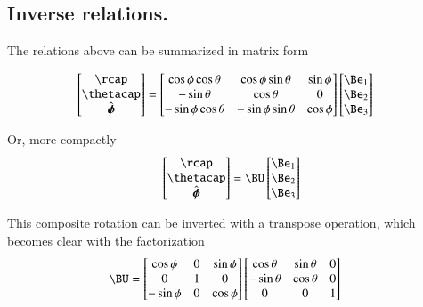 \documentclass{article}
\newcommand{\phicap}[0]{\hat{\boldsymbol{\phi}}}
\begin{document}
\subsection{ Inverse relations. }

The relations above can be summarized in matrix form

\begin{align}\label{eqn:rotation}
\begin{bmatrix}
\rcap \\
\thetacap \\
\phicap \\
\end{bmatrix}
&=
\begin{bmatrix}
\cos\phi \cos\theta & \cos\phi \sin\theta & \sin\phi \\
- \sin\theta & \cos\theta & 0 \\
- \sin\phi \cos\theta & - \sin\phi \sin\theta & \cos\phi \\
\end{bmatrix}
\begin{bmatrix}
\Be_1 \\
\Be_2 \\
\Be_3 \\
\end{bmatrix}
\end{align}

Or, more compactly
\begin{align*}
\begin{bmatrix}
\rcap \\
\thetacap \\
\phicap \\
\end{bmatrix}
=
\BU
\begin{bmatrix}
\Be_1 \\
\Be_2 \\
\Be_3 \\
\end{bmatrix}
\end{align*}

This composite rotation can be inverted with a transpose operation, which 
becomes clear with the factorization
\begin{align*}
\BU
&=
\begin{bmatrix}
\cos\phi & 0 & \sin\phi \\
0 & 1 & 0 \\
-\sin\phi & 0 & \cos\phi
\end{bmatrix}
\begin{bmatrix}
\cos\theta & \sin\theta & 0 \\
-\sin\theta & \cos\theta & 0 \\
0 & 0 & 1 \\
\end{bmatrix}
\end{align*}
\end{document}
